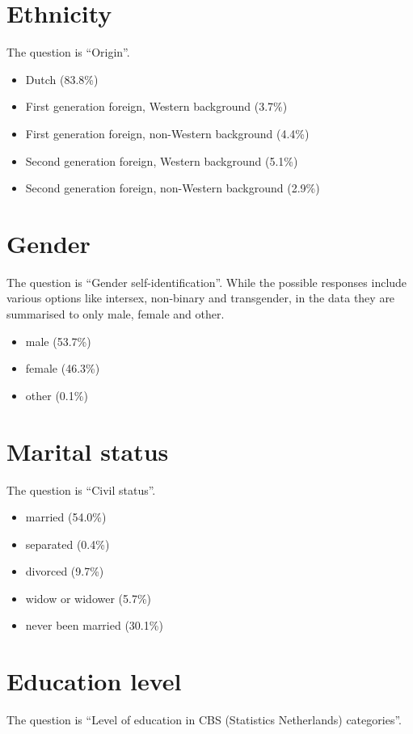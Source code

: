 \section*{Ethnicity}
The question is ``Origin''.

\begin{itemize}[nolistsep]
    \item Dutch (83.8\%)
    \item First generation foreign, Western background (3.7\%)
    \item First generation foreign, non-Western background (4.4\%)
    \item Second generation foreign, Western background (5.1\%)
    \item Second generation foreign, non-Western background (2.9\%)
\end{itemize}

\section*{Gender}
The question is ``Gender self-identification''.
While the possible responses include various options like intersex, non-binary and transgender, in the data they are summarised
to only male, female and other.

\begin{itemize}[nolistsep]
    \item male (53.7\%)
    \item female (46.3\%)
    \item other (0.1\%)
\end{itemize}

\section*{Marital status}
The question is ``Civil status''.

\begin{itemize}[nolistsep]
    \item married (54.0\%)
    \item separated (0.4\%)
    \item divorced (9.7\%)
    \item widow or widower (5.7\%)
    \item never been married (30.1\%)
\end{itemize}

\section*{Education level}
The question is ``Level of education in CBS (Statistics Netherlands) categories''.

